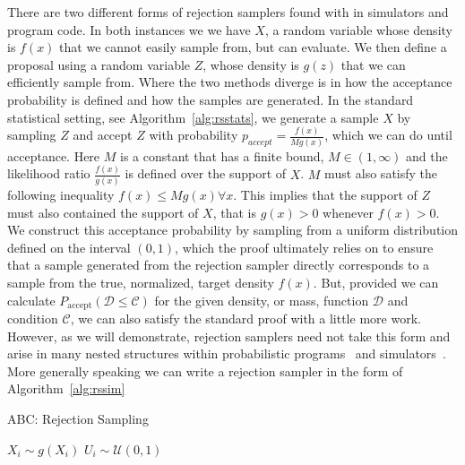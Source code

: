 \documentclass{article}
\begin{document}
There are two different forms of rejection samplers found with in simulators and program code. 
In both instances we we have $X$, a random variable whose density is $f(x)$ that we cannot easily 
sample from, but can evaluate.
We then define a proposal using a random variable $Z$, whose density is $g(z)$  that we can efficiently
sample from.
Where the two methods diverge is in how the acceptance probability is defined and how the samples are generated.
In the standard statistical setting, see Algorithm~\ref{alg:rsstats}, we generate a sample $X$ by sampling $Z$ and accept $Z$ with probability
$p_{accept} = \frac{f(x)}{Mg(x)}$, which we can do until acceptance. 
Here $M$ is a constant that has a finite bound, $M \in (1, \infty)$ and the likelihood ratio $\frac{f(x)}{g(x)}$ is defined over the 
support of $X$. 
$M$ must also satisfy the following inequality $f(x) \leq M g(x)  \forall x$. 
This implies that the support of $Z$ must also contained the support of $X$, that is
$g(x) > 0$ whenever $f(x)>0$. 
We construct this acceptance probability by sampling from a uniform distribution defined on the interval 
$(0,1)$, which the proof ultimately relies on to ensure that a sample generated from the rejection sampler directly 
corresponds to a sample from the true, normalized, target density $f(x)$. 
But, provided we can calculate $P_{\text{accept}}(\mathcal{D} \leq \mathcal{C})$ for the given density, or mass, function
 $\mathcal{D}$ and condition $\mathcal{C}$, we can also satisfy the standard proof with a little more work.
 However, as we will demonstrate, rejection samplers 
 need not take this form and arise in many nested structures within probabilistic programs~\cite{rainforth2018nesting} and simulators~\cite{smith2008towards,bershteyn2018implementation,gleisberg2009event}.
 More generally speaking we can write a rejection sampler in the form of Algorithm~\ref{alg:rssim}
\begin{algorithm}
  \small
   \caption{ABC: Rejection Sampling}
   \label{alg:rsstats}
    \begin{algorithmic}\small
       \State $X_{i} \sim g(X_{i})$ 
       \State $U_{i} \sim \mathcal{U}(0,1)$
       \Else
       \EndIf
\end{algorithmic}
\end{algorithm}
\end{document}
